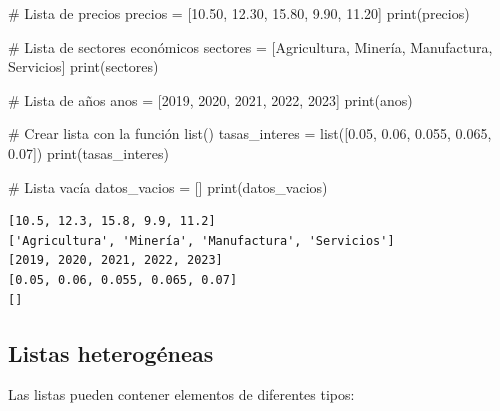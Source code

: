 \documentclass[
  doc,
  floatsintext,
  longtable,
  a4paper,
  nolmodern,
  notxfonts,
  notimes,
  12pt,
  colorlinks=true,linkcolor=blue,citecolor=blue,urlcolor=blue]{apa7}
\newenvironment{Shaded}{\begin{snugshade}}{\end{snugshade}}
\newcommand{\BuiltInTok}[1]{\textcolor[rgb]{0.00,0.23,0.31}{#1}}
\newcommand{\CommentTok}[1]{\textcolor[rgb]{0.37,0.37,0.37}{#1}}
\newcommand{\DecValTok}[1]{\textcolor[rgb]{0.68,0.00,0.00}{#1}}
\newcommand{\FloatTok}[1]{\textcolor[rgb]{0.68,0.00,0.00}{#1}}
\newcommand{\NormalTok}[1]{\textcolor[rgb]{0.00,0.23,0.31}{#1}}
\newcommand{\OperatorTok}[1]{\textcolor[rgb]{0.37,0.37,0.37}{#1}}
\newcommand{\StringTok}[1]{\textcolor[rgb]{0.13,0.47,0.30}{#1}}
\begin{document}
\begin{Shaded}
\begin{Highlighting}[]
\CommentTok{\# Lista de precios}
\NormalTok{precios }\OperatorTok{=}\NormalTok{ [}\FloatTok{10.50}\NormalTok{, }\FloatTok{12.30}\NormalTok{, }\FloatTok{15.80}\NormalTok{, }\FloatTok{9.90}\NormalTok{, }\FloatTok{11.20}\NormalTok{]}
\BuiltInTok{print}\NormalTok{(precios)}

\CommentTok{\# Lista de sectores económicos}
\NormalTok{sectores }\OperatorTok{=}\NormalTok{ [}\StringTok{\textquotesingle{}Agricultura\textquotesingle{}}\NormalTok{, }\StringTok{\textquotesingle{}Minería\textquotesingle{}}\NormalTok{, }\StringTok{\textquotesingle{}Manufactura\textquotesingle{}}\NormalTok{, }\StringTok{\textquotesingle{}Servicios\textquotesingle{}}\NormalTok{]}
\BuiltInTok{print}\NormalTok{(sectores)}

\CommentTok{\# Lista de años}
\NormalTok{anos }\OperatorTok{=}\NormalTok{ [}\DecValTok{2019}\NormalTok{, }\DecValTok{2020}\NormalTok{, }\DecValTok{2021}\NormalTok{, }\DecValTok{2022}\NormalTok{, }\DecValTok{2023}\NormalTok{]}
\BuiltInTok{print}\NormalTok{(anos)}

\CommentTok{\# Crear lista con la función list()}
\NormalTok{tasas\_interes }\OperatorTok{=} \BuiltInTok{list}\NormalTok{([}\FloatTok{0.05}\NormalTok{, }\FloatTok{0.06}\NormalTok{, }\FloatTok{0.055}\NormalTok{, }\FloatTok{0.065}\NormalTok{, }\FloatTok{0.07}\NormalTok{])}
\BuiltInTok{print}\NormalTok{(tasas\_interes)}

\CommentTok{\# Lista vacía}
\NormalTok{datos\_vacios }\OperatorTok{=}\NormalTok{ []}
\BuiltInTok{print}\NormalTok{(datos\_vacios)}
\end{Highlighting}
\end{Shaded}

\begin{verbatim}
[10.5, 12.3, 15.8, 9.9, 11.2]
['Agricultura', 'Minería', 'Manufactura', 'Servicios']
[2019, 2020, 2021, 2022, 2023]
[0.05, 0.06, 0.055, 0.065, 0.07]
[]
\end{verbatim}

\subsection{Listas heterogéneas}\label{listas-heteroguxe9neas}

Las listas pueden contener elementos de diferentes tipos:
\end{document}
